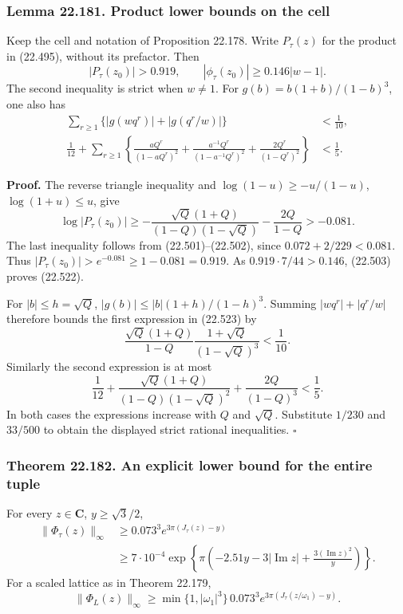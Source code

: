 \documentclass[
  11pt,
  a4paper,
]{article}
\begin{document}
\subsubsection{Lemma 22.181. Product lower bounds on the
cell}\label{lemma-22.181.-product-lower-bounds-on-the-cell}

Keep the cell and notation of Proposition 22.178. Write \(P_\tau(z)\)
for the product in (22.495), without its prefactor. Then \[
 |P_\tau(z_0)|>0.919,\qquad
 |\phi_\tau(z_0)|\ge0.146|w-1|.
 \tag{22.522}
\] The second inequality is strict when \(w\ne1\). For
\(g(b)=b(1+b)/(1-b)^3\), one also has \[
 \begin{split}
 \sum_{r\ge1}\{|g(wq^r)|+|g(q^r/w)|\}&<\frac1{10},\\
 \frac1{12}+\sum_{r\ge1}\left\{
  \frac{aQ^r}{(1-aQ^r)^2}
  +\frac{a^{-1}Q^r}{(1-a^{-1}Q^r)^2}
  +\frac{2Q^r}{(1-Q^r)^2}\right\}&<\frac15.
 \end{split}
 \tag{22.523}
\]

\textbf{Proof.} The reverse triangle inequality and
\(\log(1-u)\ge-u/(1-u)\), \(\log(1+u)\le u\), give \[
 \log|P_\tau(z_0)|\ge
 -\frac{\sqrt Q(1+Q)}{(1-Q)(1-\sqrt Q)}
 -\frac{2Q}{1-Q}>-0.081.
 \tag{22.524}
\] The last inequality follows from (22.501)--(22.502), since
\(0.072+2/229<0.081\). Thus
\(|P_\tau(z_0)|>e^{-0.081}\ge1-0.081=0.919\). As
\(0.919\cdot7/44>0.146\), (22.503) proves (22.522).

For \(|b|\le h=\sqrt Q\), \(|g(b)|\le |b|(1+h)/(1-h)^3\). Summing
\(|wq^r|+|q^r/w|\) therefore bounds the first expression in (22.523) by
\[
 \frac{\sqrt Q(1+Q)}{1-Q}
          \frac{1+\sqrt Q}{(1-\sqrt Q)^3}<\frac1{10}.
 \tag{22.525}
\] Similarly the second expression is at most \[
 \frac1{12}
 +\frac{\sqrt Q(1+Q)}{(1-Q)(1-\sqrt Q)^2}
 +\frac{2Q}{(1-Q)^3}<\frac15.
 \tag{22.526}
\] In both cases the expressions increase with \(Q\) and \(\sqrt Q\).
Substitute \(1/230\) and \(33/500\) to obtain the displayed strict
rational inequalities. \(\square\)

\subsubsection{Theorem 22.182. An explicit lower bound for the entire
tuple}\label{theorem-22.182.-an-explicit-lower-bound-for-the-entire-tuple}

For every \(z\in\mathbf C\), \(y\ge\sqrt3/2\), \[
 \begin{split}
 \|\Phi_\tau(z)\|_\infty
 &\ge 0.073^3 e^{3\pi(J_\tau(z)-y)}\\
 &\ge 7\cdot10^{-4}
  \exp\left\{\pi\left(
  -2.51y-3|\operatorname{Im}z|
  +\frac{3(\operatorname{Im}z)^2}{y}\right)\right\}.
 \end{split}
 \tag{22.527}
\] For a scaled lattice as in Theorem 22.179, \[
 \|\Phi_L(z)\|_\infty
 \ge\min\{1,|\omega_1|^3\}\,0.073^3
       e^{3\pi(J_\tau(z/\omega_1)-y)}.
 \tag{22.528}
\]
\end{document}
